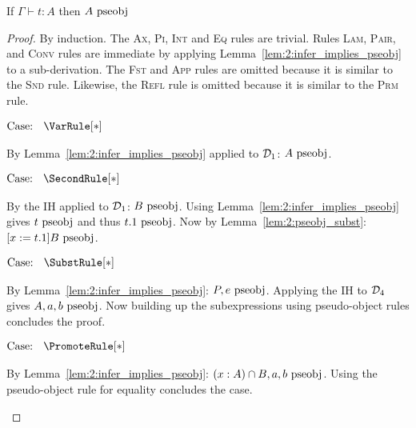 \begin{lemma}
    If $\Gamma \vdash t : A$ then $A~\textnormal{pseobj}$
    \label{lem:2:infer_implies_pseobj_type}
\end{lemma}
\begin{proof}
    By induction.
    The \textsc{Ax}, \textsc{Pi}, \textsc{Int} and \textsc{Eq} rules are trivial.
    Rules \textsc{Lam}, \textsc{Pair}, and \textsc{Conv} rules are immediate by applying Lemma~\ref{lem:2:infer_implies_pseobj} to a sub-derivation.
    The \textsc{Fst} and \textsc{App} rules are omitted because it is similar to the \textsc{Snd} rule.
    Likewise, the \textsc{Refl} rule is omitted because it is similar to the \textsc{Prm} rule.

    $\text{Case: }\begin{array}{c} \VarRule[*] \end{array}$
    \begin{proofcase}
        By Lemma~\ref{lem:2:infer_implies_pseobj} applied to $\mathcal{D}_{1}$: $A~\textnormal{pseobj}$.
    \end{proofcase}

    $\text{Case: }\begin{array}{c} \SecondRule[*] \end{array}$
    \begin{proofcase}
        By the IH applied to $\mathcal{D}_{1}$: $B~\textnormal{pseobj}$.
        Using Lemma~\ref{lem:2:infer_implies_pseobj} gives $t~\textnormal{pseobj}$ and thus $t.1~\textnormal{pseobj}$.
        Now by Lemma~\ref{lem:2:pseobj_subst}: $[x := t.1]B~\textnormal{pseobj}$.
    \end{proofcase}

    \begin{minipage}{.8\textwidth} $\text{Case: }\begin{array}{c} \SubstRule[*] \end{array}$ \end{minipage}
    \begin{proofcase}
        By Lemma~\ref{lem:2:infer_implies_pseobj}: $P, e~\textnormal{pseobj}$.
        Applying the IH to $\mathcal{D}_{4}$ gives $A, a, b~\textnormal{pseobj}$.
        Now building up the subexpressions using pseudo-object rules concludes the proof.
    \end{proofcase}

    $\text{Case: }\begin{array}{c} \PromoteRule[*] \end{array}$
    \begin{proofcase}
        By Lemma~\ref{lem:2:infer_implies_pseobj}: $(x : A) \cap B, a, b~\textnormal{pseobj}$.
        Using the pseudo-object rule for equality concludes the case.
    \end{proofcase}


\end{proof}
